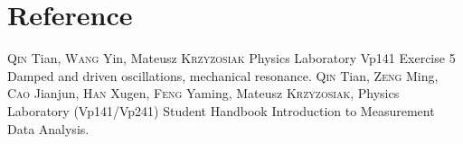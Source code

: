 \section{Reference}

\begin{thebibliography}{99}
     \textsc{Qin} Tian, \textsc{Wang} Yin, Mateusz \textsc{Krzyzosiak} Physics Laboratory Vp141 Exercise 5 Damped and driven oscillations, mechanical resonance.
     \textsc{Qin} Tian, \textsc{Zeng} Ming, \textsc{Cao} Jianjun, \textsc{Han} Xugen, \textsc{Feng} Yaming, Mateusz \textsc{Krzyzosiak}, Physics Laboratory (Vp141/Vp241) Student Handbook Introduction to Measurement Data Analysis.
\end{thebibliography}